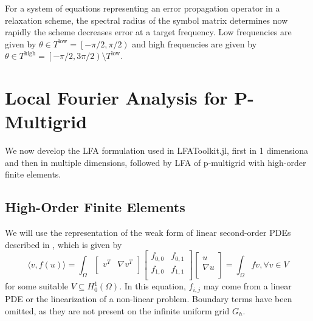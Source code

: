 \documentclass[review]{siamart190516}
\begin{document}
For a system of equations representing an error propagation operator in a relaxation scheme, the spectral radius of the symbol matrix determines now rapidly the scheme decreases error at a target frequency.
Low frequencies are given by $\theta \in T^{\text{low}} = \left[ - \pi / 2, \pi / 2 \right)$ and high frequencies are given by $\theta \in T^{\text{high}} = \left[ - \pi / 2, 3 \pi / 2 \right) \setminus T^{\text{low}}$. %

\section{Local Fourier Analysis for P-Multigrid}\label{sec:lfa}

We now develop the LFA formulation used in LFAToolkit.jl, first in 1 dimensiona and then in multiple dimensions, followed by LFA of p-multigrid with high-order finite elements.

\subsection{High-Order Finite Elements}\label{sec:highorder}

We will use the representation of the weak form of linear second-order PDEs described in \cite{brown2010efficient}, which is given by
\begin{equation}
\langle v, f \left( u \right) \rangle = \int_{\Omega}
\begin{bmatrix}
  v^T & \nabla v^T    \\
\end{bmatrix}
\begin{bmatrix}
  f_{0, 0} & f_{0, 1} \\
  f_{1, 0} & f_{1, 1} \\
\end{bmatrix}
\begin{bmatrix}
  u                   \\
  \nabla u            \\
\end{bmatrix}
= \int_{\Omega} f v, \forall v \in V
\end{equation}
for some suitable $V \subseteq H_0^1 \left( \Omega \right)$.
In this equation, $f_{i, j}$ may come from a linear PDE or the linearization of a non-linear problem.
Boundary terms have been omitted, as they are not present on the infinite uniform grid $G_h$.
\end{document}
